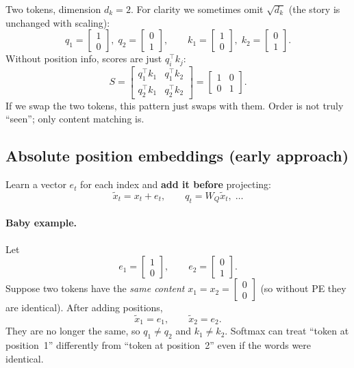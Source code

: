 \documentclass[11pt]{article}
\begin{document}
Two tokens, dimension \(d_k=2\). For clarity we sometimes omit
\(\sqrt{d_k}\) (the story is unchanged with scaling):
\[
  q_1=\begin{bmatrix}1\\0\end{bmatrix},\;
  q_2=\begin{bmatrix}0\\1\end{bmatrix},\qquad
  k_1=\begin{bmatrix}1\\0\end{bmatrix},\;
  k_2=\begin{bmatrix}0\\1\end{bmatrix}.
\]
Without position info, scores are just \(q_i^\top k_j\):
\[
  S
  =
  \begin{bmatrix}
    q_1^\top k_1 & q_1^\top k_2 \\
    q_2^\top k_1 & q_2^\top k_2
  \end{bmatrix}
  =
  \begin{bmatrix}
    1 & 0 \\
    0 & 1
  \end{bmatrix}.
\]
If we swap the two tokens, this pattern just swaps with them. Order is not
truly ``seen''; only content matching is.

\subsection{Absolute position embeddings (early approach)}

Learn a vector \(e_t\) for each index and \textbf{add it before} projecting:
\[
  \tilde{x}_t = x_t + e_t,
  \qquad
  q_t = W_Q \tilde{x}_t,\;\ldots
\]

\paragraph{Baby example.}
Let
\[
  e_1=\begin{bmatrix}1\\0\end{bmatrix},\qquad
  e_2=\begin{bmatrix}0\\1\end{bmatrix}.
\]
Suppose two tokens have the \emph{same content}
\(x_1=x_2=\begin{bmatrix}0\\0\end{bmatrix}\)
(so without PE they are identical). After adding positions,
\[
  \tilde{x}_1=e_1,\qquad \tilde{x}_2=e_2.
\]
They are no longer the same, so \(q_1\neq q_2\) and \(k_1\neq k_2\).
Softmax can treat ``token at position~1'' differently from ``token at
position~2'' even if the words were identical.
\end{document}
